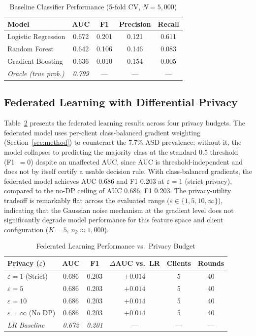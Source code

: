 \documentclass[journal]{IEEEtran}
\newcommand{\eps}{\varepsilon}
\begin{document}
\begin{table}[t]
\centering
\caption{Baseline Classifier Performance (5-fold CV, $N=5{,}000$)}
\label{tab:baseline}
\renewcommand{\arraystretch}{1.2}
\begin{tabular}{lcccc}
\toprule
\textbf{Model} & \textbf{AUC} & \textbf{F1} & \textbf{Precision} & \textbf{Recall} \\
\midrule
Logistic Regression & 0.672 & 0.201 & 0.121 & 0.611 \\
Random Forest       & 0.642 & 0.106 & 0.146 & 0.083 \\
Gradient Boosting   & 0.636 & 0.010 & 0.154 & 0.005 \\
\midrule
\textit{Oracle (true prob.)} & \textit{0.799} & --- & --- & --- \\
\bottomrule
\end{tabular}
\end{table}

\subsection{Federated Learning with Differential Privacy}

Table~\ref{tab:fl} presents the federated learning results across
four privacy budgets. The federated model uses per-client
class-balanced gradient weighting (Section~\ref{sec:method}) to
counteract the 7.7\% ASD prevalence; without it, the model collapses
to predicting the majority class at the standard 0.5 threshold
(F1~$=0$) despite an unaffected AUC, since AUC is threshold-independent
and does not by itself certify a usable decision rule. With
class-balanced gradients, the federated model achieves AUC 0.686
and F1 0.203 at $\eps=1$ (strict privacy), compared to the no-DP
ceiling of AUC 0.686, F1 0.203. The privacy-utility tradeoff is
remarkably flat across the evaluated range ($\eps \in \{1, 5, 10,
\infty\}$), indicating that the Gaussian noise mechanism at the
gradient level does not significantly degrade model performance for
this feature space and client configuration ($K=5$, $n_k \approx
1{,}000$).

\begin{table}[t]
\centering
\caption{Federated Learning Performance vs.\ Privacy Budget}
\label{tab:fl}
\renewcommand{\arraystretch}{1.2}
\begin{tabular}{lccccc}
\toprule
\textbf{Privacy ($\eps$)} & \textbf{AUC} & \textbf{F1} & \textbf{$\Delta$AUC vs.\ LR} & \textbf{Clients} & \textbf{Rounds} \\
\midrule
$\eps=1$ (Strict)   & 0.686 & 0.203 & $+0.014$ & 5 & 40 \\
$\eps=5$            & 0.686 & 0.203 & $+0.014$ & 5 & 40 \\
$\eps=10$           & 0.686 & 0.203 & $+0.014$ & 5 & 40 \\
$\eps=\infty$ (No DP) & 0.686 & 0.203 & $+0.014$ & 5 & 40 \\
\midrule
\textit{LR Baseline} & \textit{0.672} & \textit{0.201} & --- & --- & --- \\
\bottomrule
\end{tabular}
\end{table}
\end{document}
